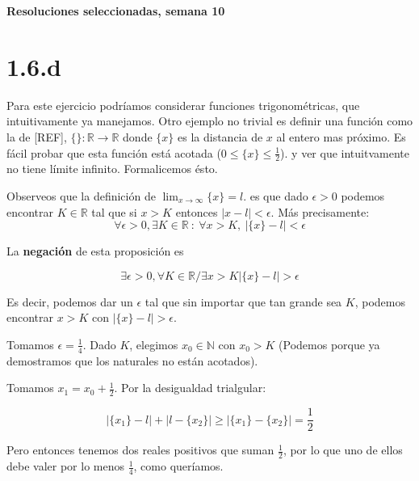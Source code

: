 \documentclass[10pt,a4paper]{article}
\begin{document}
\vspace{0,3cm}

\begin{center}
{\bf \Large Resoluciones seleccionadas, semana 10}
\end{center}


\vspace{0,3cm}

\section*{1.6.d}\emph{}

\noindent
Para este ejercicio podr\'iamos considerar funciones
trigonom\'etricas, que intuitivamente ya manejamos.
Otro ejemplo no trivial es definir una funci\'on como la de [REF],
$\{ \} : \mathbb{R}\rightarrow\mathbb{R}$ donde $\{x\}$ es la distancia
de $x$ al entero mas pr\'oximo.
Es f\'acil probar que esta funci\'on est\'a acotada
($0\leq\{x\}\leq\frac{1}{2}$). y ver que intuitvamente no tiene l\'imite
infinito. Formalicemos \'esto.

\noindent
Observeos que la definici\'on de $\displaystyle{\lim_{x\rightarrow \infty}
  \{x\}= l}$.
es que dado $\epsilon > 0$ podemos encontrar
$K\in\mathbb{R}$ tal que si $x > K$ entonces $|x-l|<\epsilon$.
M\'as precisamente:
$$
\forall \epsilon>0, \exists K\in\mathbb{R} \: : \: \forall x>K, \: |\{x\}-l|<
\epsilon
$$

\noindent
La {\bf negaci\'on} de esta proposici\'on es 

$$
\exists \epsilon>0, \forall K\in\mathbb{R} / \exists x>K |\{x\}-l|>\epsilon
$$

\noindent
Es decir, podemos dar un $\epsilon$ tal que sin importar que tan grande sea
$K$, podemos encontrar $x>K$ con $|\{x\}-l|>\epsilon$.

\noindent
Tomamos $\epsilon=\frac{1}{4}$. Dado $K$, elegimos $x_0\in\mathbb{N}$ con
$x_0>K$ (Podemos porque ya demostramos que los naturales no est\'an acotados).

\noindent
Tomamos $x_1 = x_0 + \frac{1}{2}$.
Por la desigualdad trialgular:

$$
|\{x_1\} - l| + |l - \{x_2\}| \geq |\{x_1\} - \{x_2\}| = \frac{1}{2}
$$

\noindent
Pero entonces tenemos dos reales positivos que suman $\frac{1}{2}$, por lo que
uno de ellos debe valer por lo menos $\frac{1}{4}$, como quer\'iamos.
\end{document}
